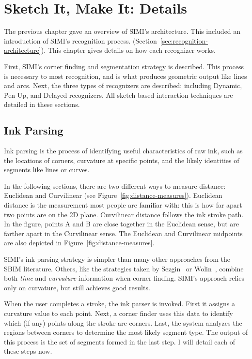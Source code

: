 \chapter{Sketch It, Make It: Details}
\label{sec:details}

The previous chapter gave an overview of SIMI's architecture. This
included an introduction of SIMI's recognition process.
(Section~\ref{sec:recognition-architecture}). This chapter gives
details on how each recognizer works. 

First, SIMI's corner finding and segmentation strategy is
described. This process is necessary to most recognition, and is what
produces geometric output like lines and arcs. Next, the three types
of recognizers are described: including Dynamic, Pen Up, and Delayed
recognizers. All sketch based interaction techniques are detailed in
these sections.

\section{Ink Parsing}
\label{sec:corner-finder}

Ink parsing is the process of identifying useful characteristics of
raw ink, such as the locations of corners, curvature at specific
points, and the likely identities of segments like lines or curves.

In the following sections, there are two different ways to measure
distance: Euclidean and Curvilinear (see
Figure~\ref{fig:distance-measures}). Euclidean distance is the
measurement most people are familiar with: this is how far apart two
points are on the 2D plane. Curvilinear distance follows the ink
stroke path. In the figure, points A and B are close together in the
Euclidean sense, but are farther apart in the Curvilinear sense. The
Euclidean and Curvilinear midpoints are also depicted in
Figure~\ref{fig:distance-measures}. 



SIMI's ink parsing strategy is simpler than many other approaches from
the SBIM literature. Others, like the strategies taken by
Sezgin~\cite{sezgin-early-processing} or Wolin~\cite{wolin-smr},
combine both \textit{time} and \textit{curvature} information when
corner finding. SIMI's approach relies only on curvature, but still
achieves good results.

When the user completes a stroke, the ink parser is invoked. First it
assigns a curvature value to each point. Next, a corner finder uses
this data to identify which (if any) points along the stroke are
corners. Last, the system analyzes the regions between corners to
determine the most likely segment type. The output of this process is
the set of segments formed in the last step. I will detail each of
these steps now.

